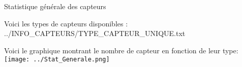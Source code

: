 \documentclass{article}
\makeatletter
\newcommand\verbfile[1]{%
	\begingroup
		\let\do\@makeother\dospecials
		\obeyspaces\obeylines\ttfamily
		#1\relax
	\endgroup
}
\makeatother
\begin{document}
{\Huge Statistique générale des capteurs\par}
\bigbreak
Voici les types de capteurs disponibles :
\bigbreak
\verbfile{../INFO_CAPTEURS/TYPE_CAPTEUR_UNIQUE.txt}
\bigbreak
\bigbreak
Voici le graphique montrant le nombre de capteur en fonction de leur type:
\texttt{[image: ../Stat\_Generale.png]}
\end{document}
